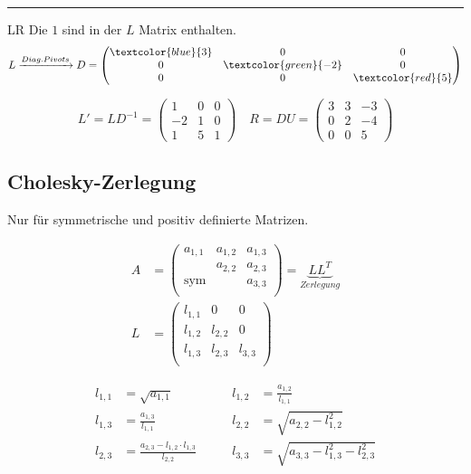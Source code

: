 \hrule\vspace{0.2cm}

\noindent LR
{\tiny Die $1$ sind in der $L$ Matrix enthalten.}
\[
L \xrightarrow{Diag. Pivots} D = \begin{pmatrix}
	\textcolor{blue}{3} & 0 &0 \\
	0 & \textcolor{green}{-2} & 0 \\
	0 & 0 & \textcolor{red}{5}
\end{pmatrix}
\]

\[
L' = LD^{-1} = \begin{pmatrix}
	1 & 0 & 0 \\ 
	-2 & 1 & 0 \\
	1 & 5 & 1
\end{pmatrix} 
\quad
R = DU = \begin{pmatrix}
	3 & 3 & -3 \\
	0 & 2 & -4 \\
	0 & 0 & 5
\end{pmatrix}
\]

\subsection{Cholesky-Zerlegung}
Nur für symmetrische und positiv definierte Matrizen.

\begin{align*}
	A &= \begin{pmatrix}
		a_{1,1}    & a_{1,2} & a_{1,3} \\
		& a_{2,2} & a_{2,3} \\
		\text{sym} &         & a_{3,3} \\
	\end{pmatrix} = \underbrace{LL^T}_{Zerlegung} \\
	L &= 
	\begin{pmatrix}
		l_{1,1} & 0 & 0 \\
		l_{1,2} & l_{2,2} & 0 \\
		l_{1,3} & l_{2,3} & l_{3,3} \\
	\end{pmatrix}
\end{align*}


\begin{align*}
	l_{1,1} &= \sqrt{a_{1,1}} &\qquad l_{1,2} &= \frac{a_{1,2}}{l_{1,1}} \\
	l_{1,3} &= \frac{a_{1,3}}{l_{1,1}} &\qquad l_{2,2} &= \sqrt{a_{2,2} - l_{1,2}^2} \\
	l_{2,3} &= \frac{a_{2,3} - l_{1,2} \cdot l_{1,3}}{l_{2,2}} &\qquad l_{3,3} &= \sqrt{a_{3,3} - l_{1,3}^2 - l_{2,3}^2} \\
\end{align*}

